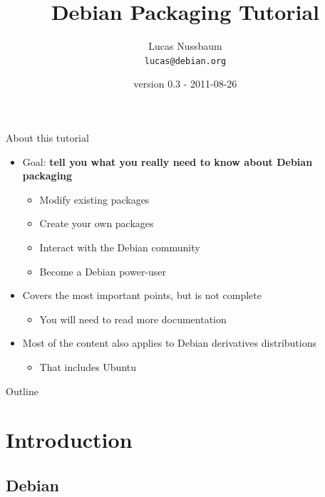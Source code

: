 \documentclass[10pt,final]{beamer}
\title{Debian Packaging Tutorial}
\author[]{Lucas Nussbaum\\{\small\texttt{lucas@debian.org}}}
\date{\footnotesize version 0.3 - 2011-08-26}
\begin{document}
\frame{\titlepage}

\begin{frame}{About this tutorial}
  \begin{itemize}
  \item Goal: \textbf{tell you what you really need to know about Debian packaging}
    \begin{itemize}
      \hbr
    \item Modify existing packages
      \hbr
    \item Create your own packages
	    \hbr
    \item Interact with the Debian community
      \hbr
    \item Become a Debian power-user
    \end{itemize}
    \br
  \item Covers the most important points, but is not complete
    \begin{itemize}
    \item You will need to read more documentation
    \end{itemize}
    \br
  \item Most of the content also applies to Debian derivatives distributions
    \begin{itemize}
      \hbr
    \item That includes Ubuntu
    \end{itemize}
  \end{itemize}
\end{frame}

\begin{frame}{Outline}
  \tableofcontents[hideallsubsections]
\end{frame}

\section{Introduction}

\subsection{Debian}
\end{document}
